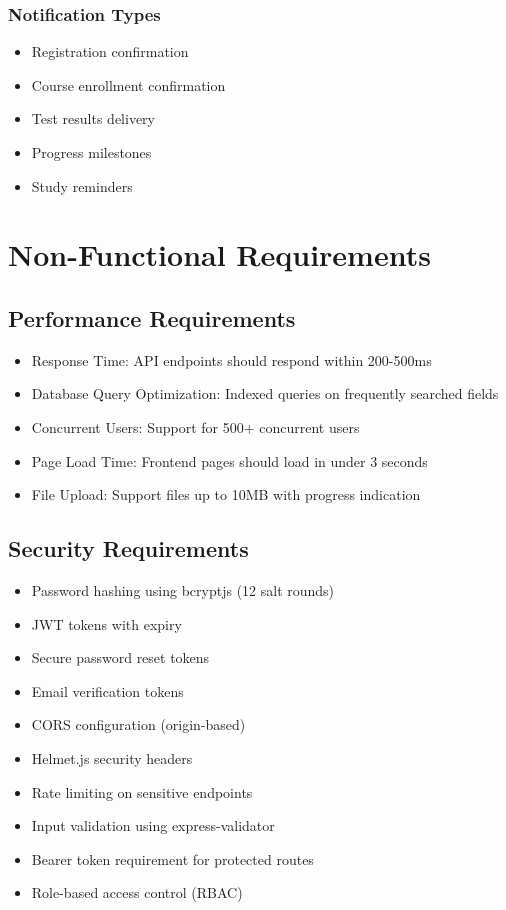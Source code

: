 \documentclass{article}
\begin{document}
\subsubsection{Notification Types}
\begin{itemize}
    \item Registration confirmation
    \item Course enrollment confirmation
    \item Test results delivery
    \item Progress milestones
    \item Study reminders
\end{itemize}

\section{Non-Functional Requirements}

\subsection{Performance Requirements}
\begin{itemize}
    \item Response Time: API endpoints should respond within 200-500ms
    \item Database Query Optimization: Indexed queries on frequently searched fields
    \item Concurrent Users: Support for 500+ concurrent users
    \item Page Load Time: Frontend pages should load in under 3 seconds
    \item File Upload: Support files up to 10MB with progress indication
\end{itemize}

\subsection{Security Requirements}
\begin{itemize}
    \item Password hashing using bcryptjs (12 salt rounds)
    \item JWT tokens with expiry
    \item Secure password reset tokens
    \item Email verification tokens
    \item CORS configuration (origin-based)
    \item Helmet.js security headers
    \item Rate limiting on sensitive endpoints
    \item Input validation using express-validator
    \item Bearer token requirement for protected routes
    \item Role-based access control (RBAC)
\end{itemize}
\end{document}
